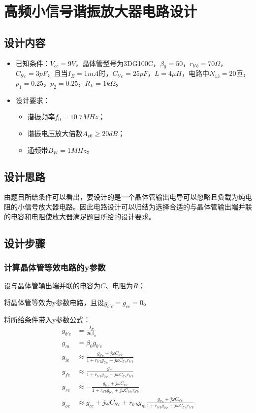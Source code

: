 \documentclass[a4paper]{ctexrep}
\begin{document}
\chapter{高频小信号谐振放大器电路设计}
\begin{spacing}{1.5}
\songti{}
\section{设计内容}
\begin{itemize}
	\item 已知条件：$V_{cc}=9V$，晶体管型号为3DG100C，$\beta_{0}=50$，$r_{b'b}=70\Omega$，$C_{b'c}=3pF$，且当$I_{E}=1mA$时，$C_{b'e}=25pF$，$L=4\mu H$，电路中$N_{13}=20$匝，$p_{1}=0.25$，$p_{2}=0.25$，$R_{L}=1k\Omega$。
	\item 设计要求：
	\begin{itemize}
		\item 谐振频率$f_{0}=10.7MHz$；
		\item 谐振电压放大倍数$A_{v0}\geq 20dB$；
		\item 通频带$B_{W}=1MHz$。
	\end{itemize}
\end{itemize}
\section{设计思路}
由题目所给条件可以看出，要设计的是一个晶体管输出电导可以忽略且负载为纯电阻的小信号放大器电路。因此电路设计可以归结为选择合适的与晶体管输出端并联的电容和电阻使放大器满足题目所给的设计要求。
\section{设计步骤}
\subsection{计算晶体管等效电路的y参数}
设与晶体管输出端并联的电容为$C$、电阻为$R$；

将晶体管等效为y参数电路，且设$g_{b'c}=g_{ce}=0$。

将所给条件带入y参数公式：
\begin{equation}
\begin{split}
g_{b'e}&=\frac{I_{E}}{26\beta_{0}}\\
g_{m}&=\beta_{0}g_{b'e}\\
y_{ie}&\approx\frac{g_{b'e}+j\omega C_{b'e}}{1+r_{b'b}g_{b'e}+j\omega C_{b'e}r_{b'b}}\\
y_{fe}&\approx\frac{g_{m}}{1+r_{b'b}g_{b'e}+j\omega C_{b'e}r_{b'b}}\\
y_{re}&\approx-\frac{g_{b'c}+j\omega C_{b'c}}{1+r_{b'b}g_{b'e}+j\omega C_{b'e}r_{b'b}}\\
y_{oe}&\approx g_{ce}+j\omega C_{b'c}+r_{b'b}g_{m}\frac{g_{b'c}+j\omega C_{b'e}}{1+r_{b'b}g_{b'e}+j\omega C_{b'e}r_{b'b}}
\end{split}
\end{equation}


\end{spacing}
\end{document}
